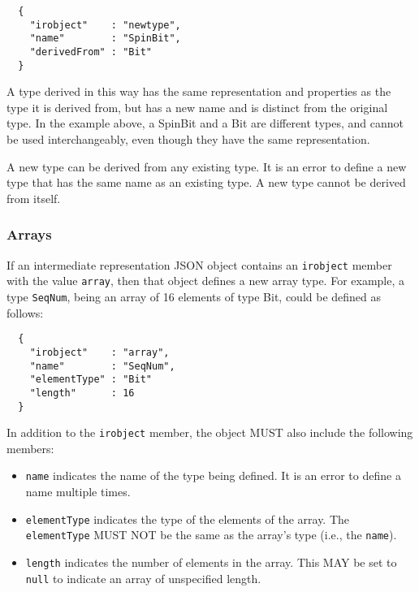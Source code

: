 \documentclass[10pt,twocolumn,a4paper]{article}
\begin{document}
\begin{verbatim}
  {
    "irobject"    : "newtype",
    "name"        : "SpinBit",
    "derivedFrom" : "Bit"
  }
\end{verbatim}

A type derived in this way has the same representation and properties as
the type it is derived from, but has a new name and is distinct from the
original type.  In the example above, a SpinBit and a Bit are different
types, and cannot be used interchangeably, even though they have the same
representation.

A new type can be derived from any existing type. It is an error to define
a new type that has the same name as an existing type. A new type cannot be
derived from itself.

\subsubsection{Arrays}

If an intermediate representation JSON object contains an \texttt{irobject}
member with the value \texttt{array}, then that object defines a new array
type. For example, a type \texttt{SeqNum}, being an array of 16 elements of
type Bit, could be defined as follows:

\begin{verbatim}
  {
    "irobject"    : "array",
    "name"        : "SeqNum",
    "elementType" : "Bit"
    "length"      : 16
  }
\end{verbatim}

In addition to the \texttt{irobject} member, the object MUST also include
the following members:
\begin{itemize}
  \item \texttt{name} indicates the name of the type being defined. It is
    an error to define a name multiple times.
  \item \texttt{elementType} indicates the type of the elements of the
    array. The \texttt{elementType} MUST NOT be the same as the array's
    type (i.e., the \texttt{name}).
  \item \texttt{length} indicates the number of elements in the array. This
    MAY be set to \texttt{null} to indicate an array of unspecified length.
\end{itemize}

\end{document}
